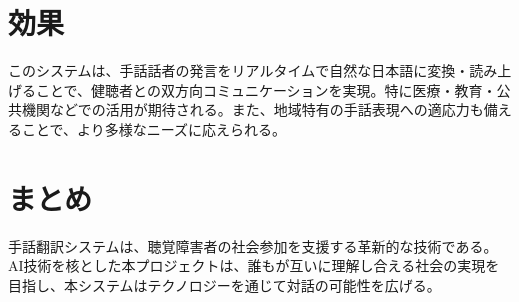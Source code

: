 \documentclass[12pt,a4paper]{jsarticle}
\begin{document}
\section{効果}
このシステムは、手話話者の発言をリアルタイムで自然な日本語に変換・読み上げることで、健聴者との双方向コミュニケーションを実現。特に医療・教育・公共機関などでの活用が期待される。また、地域特有の手話表現への適応力も備えることで、より多様なニーズに応えられる。

\section{まとめ}

手話翻訳システムは、聴覚障害者の社会参加を支援する革新的な技術である。AI技術を核とした本プロジェクトは、誰もが互いに理解し合える社会の実現を目指し、本システムはテクノロジーを通じて対話の可能性を広げる。
\end{document}
